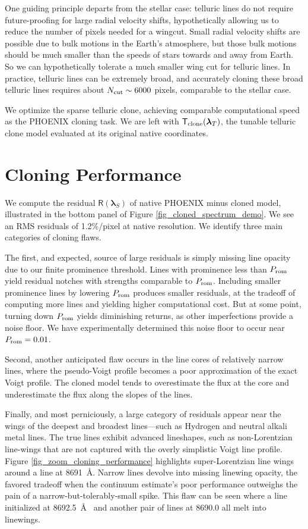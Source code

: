 \documentclass[modern]{aastex631}
\begin{document}
One guiding principle departs from the stellar case: telluric lines do not require future-proofing for large radial velocity shifts, hypothetically allowing us to reduce the number of pixels needed for a wingcut.  Small radial velocity shifts are possible due to bulk motions in the Earth's atmosphere, but those bulk motions should be much smaller than the speeds of stars towards and away from Earth.  So we can hypothetically tolerate a much smaller wing cut for telluric lines.  In practice, telluric lines can be extremely broad, and accurately cloning these broad telluric lines requires about $N_{\rm cut}\sim6000$ pixels, comparable to the stellar case.

We optimize the sparse telluric clone, achieving comparable computational speed as the PHOENIX cloning task.  We are left with $\mathsf{T}_{\rm clone}(\bm{\lambda}_T)$, the tunable telluric clone model evaluated at its original native coordinates.


\section{Cloning Performance}

We compute the residual $\mathsf{R}(\bm{\lambda}_S)$ of native PHOENIX minus cloned model, illustrated in the bottom panel of Figure \ref{fig_cloned_spectrum_demo}. We see an RMS residuals of 1.2\%/pixel at native resolution. We identify three main categories of cloning flaws.

The first, and expected, source of large residuals is simply missing line opacity due to our finite prominence threshold. Lines with prominence less than $P_{\rm rom}$ yield residual notches with strengths comparable to $P_{\rm rom}$. Including smaller prominence lines by lowering $P_{\rm rom}$ produces smaller residuals, at the tradeoff of computing more lines and yielding higher computational cost.  But at some point, turning down $P_{\rm rom}$ yields diminishing returns, as other imperfections provide a noise floor.  We have experimentally determined this noise floor to occur near $P_{\rm rom}=0.01$.

Second, another anticipated flaw occurs in the line cores of relatively narrow lines, where the pseudo-Voigt profile becomes a poor approximation of the exact Voigt profile.  The cloned model tends to overestimate the flux at the core and underestimate the flux along the slopes of the lines.

Finally, and most perniciously, a large category of residuals appear near the wings of the deepest and broadest lines---such as Hydrogen and neutral alkali metal lines.  The true lines exhibit advanced lineshapes, such as non-Lorentzian line-wings that are not captured with the overly simplistic Voigt line profile.  Figure \ref{fig_zoom_cloning_performance} highlights super-Lorentzian line wings around a line at 8691~\AA.  Narrow lines devolve into missing linewing opacity, the favored tradeoff when the continuum estimate's poor performance outweighs the pain of a narrow-but-tolerably-small spike. This flaw can be seen  where a line initialized at 8692.5~\AA~ and another pair of lines at 8690.0 all melt into linewings.
\end{document}
